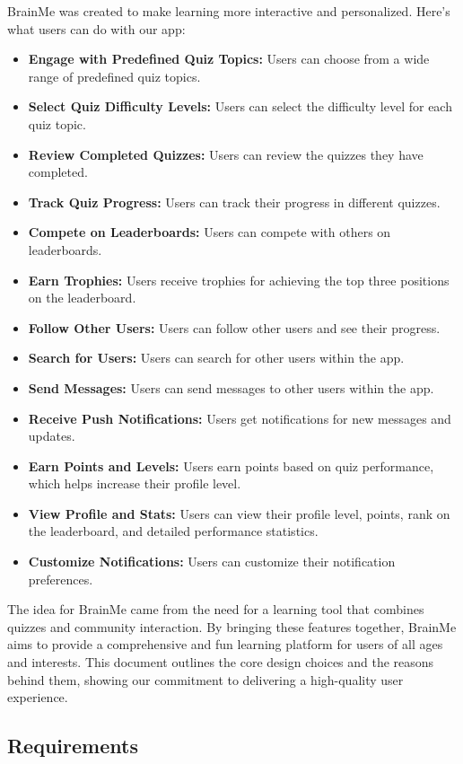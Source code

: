 BrainMe was created to make learning more interactive and personalized. Here's what users can do with our app:
\begin{itemize}
    \item \textbf{Engage with Predefined Quiz Topics:} Users can choose from a wide range of predefined quiz topics.
    \item \textbf{Select Quiz Difficulty Levels:} Users can select the difficulty level for each quiz topic.
    \item \textbf{Review Completed Quizzes:} Users can review the quizzes they have completed.
    \item \textbf{Track Quiz Progress:} Users can track their progress in different quizzes.
    \item \textbf{Compete on Leaderboards:} Users can compete with others on leaderboards.
    \item \textbf{Earn Trophies:} Users receive trophies for achieving the top three positions on the leaderboard.
    \item \textbf{Follow Other Users:} Users can follow other users and see their progress.
    \item \textbf{Search for Users:} Users can search for other users within the app.
    \item \textbf{Send Messages:} Users can send messages to other users within the app.
    \item \textbf{Receive Push Notifications:} Users get notifications for new messages and updates.
    \item \textbf{Earn Points and Levels:} Users earn points based on quiz performance, which helps increase their profile level.
    \item \textbf{View Profile and Stats:} Users can view their profile level, points, rank on the leaderboard, and detailed performance statistics.
    \item \textbf{Customize Notifications:} Users can customize their notification preferences.
\end{itemize}

The idea for BrainMe came from the need for a learning tool that combines quizzes and community interaction. By bringing these features together, BrainMe aims to provide a comprehensive and fun learning platform for users of all ages and interests. This document outlines the core design choices and the reasons behind them, showing our commitment to delivering a high-quality user experience.


\subsection{Requirements}

